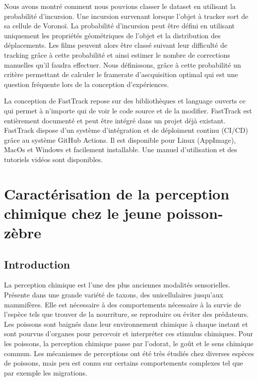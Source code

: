 Nous avons montré comment nous pouvions classer le dataset en utilisant la probabilité d'incursion. Une incursion survenant lorsque l'objet à tracker sort de sa cellule de Voronoï. La probabilité d'incursion peut être défini en utilisant uniquement les propriétés géométriques de l'objet et la distribution des déplacements. Les films peuvent alors être classé suivant leur difficulté de tracking grâce à cette probabilité et ainsi estimer le nombre de corrections manuelles qu'il faudra effectuer. Nous définissons, grâce à cette probabilité un critère permettant de calculer le framerate d'ascquisition optimal qui est une question fréquente lors de la conception d'expériences.

La conception de FastTrack repose sur des bibliothèques et language ouverts ce qui permet à n'importe qui de voir le code source et de la modifier. FastTrack est entièrement documenté et peut être intégré dans un projet déjà existant. FastTrack dispose d'un système d'intégration et de déploiment continu (CI/CD) grâce au système GitHub Actions. Il est disponible pour Linux (AppImage), MacOs et Windows et facilement installable. Une manuel d'utilisation et des tutoriels vidéos sont disponibles.


\section*{Caractérisation de la perception chimique chez le jeune poisson-zèbre}

\subsection*{Introduction}
La perception chimique est l'une des plus anciennes modalités sensorielles. Présente dans une grande variété de taxons, des unicellulaires jusqu'aux mammifères. Elle est nécessaire à des comportements nécessaire à la survie de l'espèce tels que trouver de la nourriture, se reproduire ou éviter des prédateurs. Les poissons sont baignés dans leur environnement chimique à chaque instant et sont pourvus d'organes pour percevoir et interpréter ces stimulus chimiques. Pour les poissons, la perception chimique passe par l'odorat, le goût et le sens chimique commun. Les mécanismes de perceptions ont été très étudiés chez diverses espèces de poissons, mais peu est connu sur certains comportements complexes tel que par exemple les migrations.

